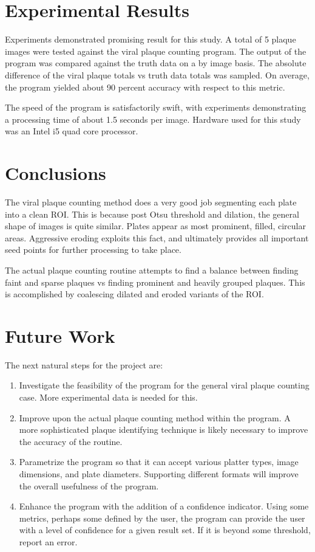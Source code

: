 \documentclass[12pt,final,onecolumn]{IEEEtran}
\begin{document}
\section{Experimental Results}
Experiments demonstrated promising result for this study. A total of 5 plaque images
were tested against the viral plaque counting program. The output of the program 
was compared against the truth data on a by image basis. The absolute difference 
of the viral plaque totals vs truth data totals was sampled. On average, the program yielded about 90 percent accuracy with respect to this metric. 

The speed of the program is satisfactorily swift, with experiments demonstrating a processing time of about 1.5 seconds per image. Hardware used for this study was an Intel i5 quad core processor. 


\section{Conclusions}
The viral plaque counting method does a very good job segmenting each plate into a 
clean ROI. This is because post Otsu threshold and dilation, the general shape of
images is quite similar. Plates appear as most prominent, filled, circular areas. 
Aggressive eroding exploits this fact, and ultimately provides all important seed points 
for further processing to take place.

The actual plaque counting routine attempts to find a balance between finding faint and 
sparse plaques vs finding prominent and heavily grouped plaques. This is accomplished by 
coalescing dilated and eroded variants of the ROI. 

\section{Future Work}
The next natural steps for the project are:
\begin{enumerate}
 \item Investigate the feasibility of the program for the general viral plaque counting case. More experimental data is needed for this. 
 \item Improve upon the actual plaque counting method within the program. A more sophisticated plaque identifying technique is likely necessary to improve the accuracy 
of the routine. 
 \item Parametrize the program so that it can accept various platter types, image 
dimensions, and plate diameters. Supporting different formats will improve the overall usefulness of the program.

 \item Enhance the program with the addition of a confidence indicator. Using some 
metrics, perhaps some defined by the user, the program can provide the user with a 
level of confidence for a given result set. If it is beyond some threshold, report an error. 
\end{enumerate}
  
\end{document}
